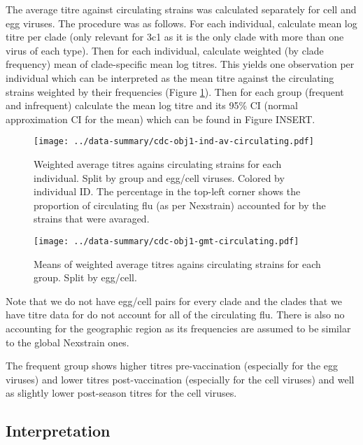 \documentclass[12pt]{article}
\begin{document}


The average titre against circulating strains was calculated separately for cell and egg viruses. The procedure was as follows. For each individual, calculate mean log titre per clade (only relevant for 3c1 as it is the only clade with more than one virus of each type). Then for each individual, calculate weighted (by clade frequency) mean of clade-specific mean log titres. This yields one observation per individual which can be interpreted as the mean titre against the circulating strains weighted by their frequencies (Figure \ref{fig:cdc-obj1-ind-av-circulating}). Then for each group (frequent and infrequent) calculate the mean log titre and its 95\% CI (normal approximation CI for the mean) which can be found in Figure INSERT.

\begin{figure}
	\texttt{[image: ../data-summary/cdc-obj1-ind-av-circulating.pdf]}
	\caption{Weighted average titres agains circulating strains for each individual. Split by group and egg/cell viruses. Colored by individual ID.  The percentage in the top-left corner shows the proportion of circulating flu (as per Nexstrain) accounted for by the strains that were avaraged.}
	\label{fig:cdc-obj1-ind-av-circulating}
\end{figure}

\begin{figure}
	\texttt{[image: ../data-summary/cdc-obj1-gmt-circulating.pdf]}
	\caption{Means of weighted average titres agains circulating strains for each group. Split by egg/cell.}
	\label{fig:cdc-obj1-gmt-circulating}
\end{figure}

Note that we do not have egg/cell pairs for every clade and the clades that we have titre data for do not account for all of the circulating flu. There is also no accounting for the geographic region as its frequencies are assumed to be similar to the global Nexstrain ones.

The frequent group shows higher titres pre-vaccination (especially for the egg viruses) and lower titres post-vaccination (especially for the cell viruses) and well as slightly lower post-season titres for the cell viruses.

\subsection{Interpretation}
\end{document}
